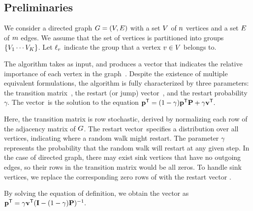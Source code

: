 \documentclass[sigconf, anonymous, review]{acmart}
\begin{document}
\subsection{Preliminaries}

We consider a directed graph $G = (V, E)$ with a set $V$ of $n$ vertices and a set $E$ of $m$ edges. 
We assume that the set of vertices is partitioned into \nogroups groups $\{\group_1 \cdots \group_{\nogroups}\}$. 
Let $\labelof_{v}$ indicate the group that a vertex $v \in V$ belongs to.

The \pagerank algorithm takes \graph as input, and produces a \pagerank vector \prvector that indicates the relative importance of each vertex in the graph~\citep{brin_anatomy_1998}.
Despite the existence of multiple equivalent formulations, the \pagerank algorithm is fully characterized by three parameters: the transition matrix~\transmatrix, the restart (or jump) vector~\vectv, and 
the restart probability~$\gamma$. 
%
The \pagerank vector~\prvector is the solution to the equation
$    \mathbf{{p}}^{\mathsf{T}} = (1 - \gamma) \mathbf{{p}}^{\mathsf{T}} \mathbf{{P}} + \gamma \mathbf{{v}}^{\mathsf{T}}.$

Here, the transition matrix \transmatrix is row stochastic, derived by normalizing each row of the adjacency matrix of $G$. The restart vector~\vectv specifies a distribution over all vertices, indicating where a random walk might restart. The parameter $\gamma$ represents the probability that the random walk will restart at any given step. In the case of directed graph, there may exist sink vertices that have no outgoing edges, so their rows in the transition matrix would be all zeros.
To handle sink vertices, we replace the corresponding zero rows of \transmatrix with the restart vector \vectv.

By solving 
the  equation of \pagerank definition, 
we obtain the \pagerank vector as 
$\mathbf{{p}}^{\mathsf{T}} = \gamma \mathbf{{v}}^{\mathsf{T}} (\mathbf{{I}} - (1 - \gamma) \mathbf{{P}})^{-1}.$ 
\end{document}
